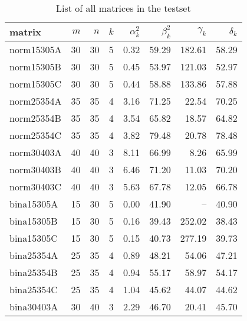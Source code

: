  \begin{scriptsize} 
 \begin{table}[h]
  \caption{List of all matrices in the testset} 
\begin{tabular*}{\linewidth}{@{\extracolsep{\fill}}lrrrrrrr@{}}\toprule
 matrix & $m$ & $n$ & $k$ & $\alpha_k^2$ & $\beta_k^2$ & $\gamma_k$ & $\delta_k$\\ \midrule
norm15305A & \num{30} & \num{30} & \num{5} & \num{0.32} & \num{59.29} & \num{182.61} & \num{58.29} \\ 
norm15305B & \num{30} & \num{30} & \num{5} & \num{0.45} & \num{53.97} & \num{121.03} & \num{52.97} \\ 
norm15305C & \num{30} & \num{30} & \num{5} & \num{0.44} & \num{58.88} & \num{133.86} & \num{57.88} \\ 
norm25354A & \num{35} & \num{35} & \num{4} & \num{3.16} & \num{71.25} & \num{22.54} & \num{70.25} \\ 
norm25354B & \num{35} & \num{35} & \num{4} & \num{3.54} & \num{65.82} & \num{18.57} & \num{64.82} \\ 
norm25354C & \num{35} & \num{35} & \num{4} & \num{3.82} & \num{79.48} & \num{20.78} & \num{78.48} \\ 
norm30403A & \num{40} & \num{40} & \num{3} & \num{8.11} & \num{66.99} & \num{8.26} & \num{65.99} \\ 
norm30403B & \num{40} & \num{40} & \num{3} & \num{6.46} & \num{71.20} & \num{11.03} & \num{70.20} \\ 
norm30403C & \num{40} & \num{40} & \num{3} & \num{5.63} & \num{67.78} & \num{12.05} & \num{66.78} \\ 
bina15305A & \num{15} & \num{30} & \num{5} & \num{0.00} & \num{41.90} & -- & \num{40.90} \\ 
bina15305B & \num{15} & \num{30} & \num{5} & \num{0.16} & \num{39.43} & \num{252.02} & \num{38.43} \\ 
bina15305C & \num{15} & \num{30} & \num{5} & \num{0.15} & \num{40.73} & \num{277.19} & \num{39.73} \\ 
bina25354A & \num{25} & \num{35} & \num{4} & \num{0.89} & \num{48.21} & \num{54.06} & \num{47.21} \\ 
bina25354B & \num{25} & \num{35} & \num{4} & \num{0.94} & \num{55.17} & \num{58.97} & \num{54.17} \\ 
bina25354C & \num{25} & \num{35} & \num{4} & \num{1.04} & \num{45.62} & \num{44.07} & \num{44.62} \\ 
bina30403A & \num{30} & \num{40} & \num{3} & \num{2.29} & \num{46.70} & \num{20.41} & \num{45.70} \\ 

\end{tabular*}
\end{table}
\end{scriptsize}
